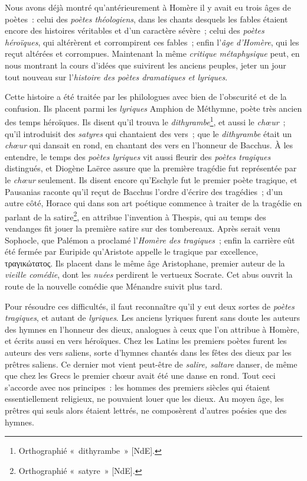 \documentclass[french,twoside]{book} %
\newcommand\chaptercont{} %
\begin{document}
\chaptercont
\noindent Nous avons déjà montré qu’antérieurement à Homère il y avait eu trois âges de poètes : celui des {\itshape poètes théologiens}, dans les chants desquels les fables étaient encore des histoires véritables et d’un caractère sévère ; celui des {\itshape poètes héroïques}, qui altérèrent et corrompirent ces fables ; enfin l’{\itshape âge d’Homère}, qui les reçut altérées et corrompues. Maintenant la même {\itshape critique métaphysique} peut, en nous montrant la cours d’idées que suivirent les anciens peuples, jeter un jour tout nouveau sur l’{\itshape histoire des poètes dramatiques et lyriques}.\par
Cette histoire a été traitée par les philologues avec bien de l’obscurité et de la confusion. Ils placent parmi les {\itshape lyriques} Amphion de Méthymne, poète très ancien des temps héroïques. Ils disent qu’il trouva le {\itshape dithyrambe}\footnote{Orthographié « dithyrambe » [NdE].}, et aussi le {\itshape chœur} ; qu’il introduisit des {\itshape satyres} qui chantaient des vers ; que le {\itshape dithyrambe} était un {\itshape chœur} qui dansait en rond, en chantant des vers en l’honneur de Bacchus. À les entendre, le temps des {\itshape poètes lyriques} vit aussi fleurir des {\itshape poètes tragiques} distingués, et Diogène Laërce assure que la première tragédie fut représentée par le {\itshape chœur} seulement. Ils disent encore qu’Eschyle fut le premier poète tragique, et Pausanias raconte qu’il reçut de Bacchus l’ordre d’écrire des tragédies ; d’un autre côté, Horace qui dans son art poétique commence à traiter de la tragédie en parlant de la satire\footnote{Orthographié « satyre » [NdE].}, en attribue l’invention à Thespis, qui au temps des vendanges fit jouer la première satire sur des tombereaux. Après serait venu Sophocle, que Palémon a proclamé l’{\itshape Homère des tragiques} ; enfin la carrière eût été fermée par Euripide qu’Aristote appelle le tragique par excellence, τραγικώτατος. Ils placent dans le même âge Aristophane, premier auteur de la {\itshape vieille comédie}, dont les {\itshape nuées} perdirent le vertueux Socrate. Cet abus ouvrit la route de la nouvelle comédie que Ménandre suivit plus tard.\par
Pour résoudre ces difficultés, il faut reconnaître qu’il y eut deux sortes de {\itshape poètes tragiques}, et autant de {\itshape lyriques}. Les anciens lyriques furent sans doute les auteurs des hymnes en l’honneur des dieux, analogues à  ceux que l’on attribue à Homère, et écrits aussi en vers héroïques. Chez les Latins les premiers poètes furent les auteurs des vers saliens, sorte d’hymnes chantés dans les fêtes des dieux par les prêtres saliens. Ce dernier mot vient peut-être de {\itshape salire, saltare} danser, de même que chez les Grecs le premier chœur avait été une danse en rond. Tout ceci s’accorde avec nos principes : les hommes des premiers siècles qui étaient essentiellement religieux, ne pouvaient louer que les dieux. Au moyen âge, les prêtres qui seuls alors étaient lettrés, ne composèrent d’autres poésies que des hymnes.\par
\end{document}
